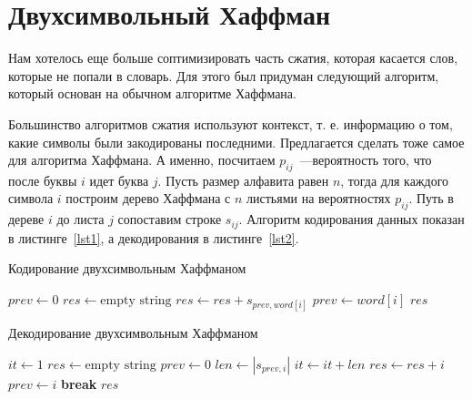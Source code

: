 \section{Двухсимвольный Хаффман}

Нам хотелось еще больше соптимизировать часть сжатия, которая касается слов, которые не попали в словарь. Для этого был придуман
следующий алгоритм, который основан на обычном алгоритме Хаффмана. 

Большинство алгоритмов сжатия используют контекст, т. е. информацию о том, какие символы были закодированы последними. 
Предлагается сделать тоже самое для алгоритма Хаффмана. А именно, посчитаем $p_{ij}$~---вероятность того, что после буквы $i$ идет буква $j$.
Пусть размер алфавита равен $n$, тогда для каждого символа $i$ построим дерево Хаффмана с $n$ листьями на вероятностях $p_{ij}$. Путь в дереве $i$
до листа $j$ сопоставим строке $s_{ij}$. Алгоритм кодирования данных показан в листинге~\ref{lst1}, а декодирования в листинге~\ref{lst2}.
\begin{algorithm}[!h]
\caption{Кодирование двухсимвольным Хаффманом}\label{lst1}
\begin{algorithmic}
		\State $prev \gets 0$
		\State $res \gets \text{empty string}$
			\State $res \gets res + s_{prev, word[i]}$
			\State $prev \gets word[i]$
		\EndFor
		\State\Return $res$
	\EndFunction
\end{algorithmic}
\end{algorithm}

\begin{algorithm}[!h]
\caption{Декодирование двухсимвольным Хаффманом}\label{lst2}
\begin{algorithmic}
		\State $it \gets 1$
		\State $res \gets \text{empty string}$
		\State $prev \gets 0$
				\State $len \gets |s_{prev, i}|$
					\State $it\gets it+len$
					\State $res \gets res + i$
					\State $prev \gets i$
					\State \textbf{break}
				\EndIf
			\EndFor
		\EndWhile
		\State\Return $res$
	\EndFunction
\end{algorithmic}
\end{algorithm}

